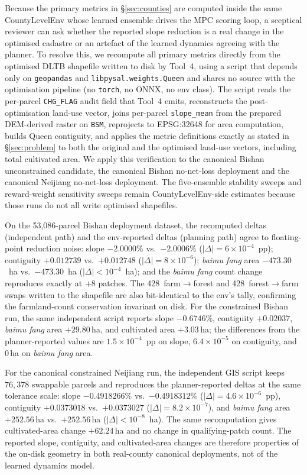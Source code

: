 \documentclass[11pt]{article}
\begin{document}
Because the primary metrics in \S\ref{sec:counties} are computed inside the same CountyLevelEnv whose learned ensemble drives the MPC scoring loop, a sceptical reviewer can ask whether the reported slope reduction is a real change in the optimised cadastre or an artefact of the learned dynamics agreeing with the planner. To resolve this, we recompute all primary metrics directly from the optimised DLTB shapefile written to disk by Tool~4, using a script that depends only on \texttt{geopandas} and \texttt{libpysal.weights.Queen} and shares no source with the optimisation pipeline (no \texttt{torch}, no ONNX, no env class). The script reads the per-parcel \texttt{CHG\_FLAG} audit field that Tool~4 emits, reconstructs the post-optimisation land-use vector, joins per-parcel \texttt{slope\_mean} from the prepared DEM-derived raster on \texttt{BSM}, reprojects to EPSG:32648 for area computation, builds Queen contiguity, and applies the metric definitions exactly as stated in \S\ref{sec:problem} to both the original and the optimised land-use vectors, including total cultivated area. We apply this verification to the canonical Bishan unconstrained candidate, the canonical Bishan no-net-loss deployment and the canonical Neijiang no-net-loss deployment. The five-ensemble stability sweeps and reward-weight sensitivity sweeps remain CountyLevelEnv-side estimates because those runs do not all write optimised shapefiles.

On the 53{,}086-parcel Bishan deployment dataset, the recomputed deltas (independent path) and the env-reported deltas (planning path) agree to floating-point reduction noise: slope $-2.0000\%$ vs.\ $-2.0006\%$ ($|\Delta|{=}6{\times}10^{-4}$~pp); contiguity $+0.012739$ vs.\ $+0.012748$ ($|\Delta|{=}8{\times}10^{-6}$); \textit{baimu fang} area $-473.30$~ha vs.\ $-473.30$~ha ($|\Delta|{<}10^{-4}$~ha); and the \textit{baimu fang} count change reproduces exactly at $+8$ patches. The 428~farm$\rightarrow$forest and 428~forest$\rightarrow$farm swaps written to the shapefile are also bit-identical to the env's tally, confirming the farmland-count conservation invariant on disk. For the constrained Bishan run, the same independent script reports slope $-0.6746\%$, contiguity $+0.02037$, \textit{baimu fang} area $+29.80$\,ha, and cultivated area $+3.03$\,ha; the differences from the planner-reported values are $1.5{\times}10^{-4}$~pp on slope, $6.4{\times}10^{-5}$ on contiguity, and $0$\,ha on \textit{baimu fang} area.

For the canonical constrained Neijiang run, the independent GIS script keeps $76{,}378$ swappable parcels and reproduces the planner-reported deltas at the same tolerance scale: slope $-0.4918266\%$ vs.\ $-0.4918312\%$ ($|\Delta|{=}4.6{\times}10^{-6}$~pp), contiguity $+0.0373018$ vs.\ $+0.0373027$ ($|\Delta|{=}8.2{\times}10^{-7}$), and \textit{baimu fang} area $+252.56$\,ha vs.\ $+252.56$\,ha ($|\Delta|{<}10^{-8}$~ha). The same recomputation gives cultivated-area change $+62.24$\,ha and no change in qualifying-patch count. The reported slope, contiguity, and cultivated-area changes are therefore properties of the on-disk geometry in both real-county canonical deployments, not of the learned dynamics model.
\end{document}
